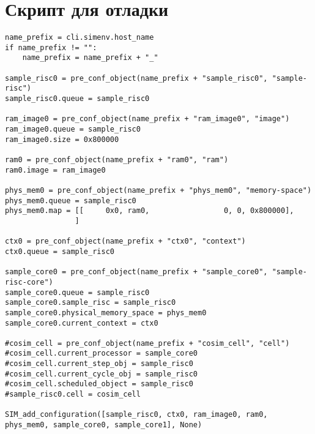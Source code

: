 \chapter{Скрипт для отладки}\label{chap:app-broken-script}

\begin{lstlisting}
name_prefix = cli.simenv.host_name
if name_prefix != "":
    name_prefix = name_prefix + "_"

sample_risc0 = pre_conf_object(name_prefix + "sample_risc0", "sample-risc")
sample_risc0.queue = sample_risc0

ram_image0 = pre_conf_object(name_prefix + "ram_image0", "image")
ram_image0.queue = sample_risc0
ram_image0.size = 0x800000

ram0 = pre_conf_object(name_prefix + "ram0", "ram")
ram0.image = ram_image0

phys_mem0 = pre_conf_object(name_prefix + "phys_mem0", "memory-space")
phys_mem0.queue = sample_risc0
phys_mem0.map = [[     0x0, ram0,                 0, 0, 0x800000],
                ]

ctx0 = pre_conf_object(name_prefix + "ctx0", "context")
ctx0.queue = sample_risc0

sample_core0 = pre_conf_object(name_prefix + "sample_core0", "sample-risc-core")
sample_core0.queue = sample_risc0
sample_core0.sample_risc = sample_risc0
sample_core0.physical_memory_space = phys_mem0
sample_core0.current_context = ctx0

#cosim_cell = pre_conf_object(name_prefix + "cosim_cell", "cell")
#cosim_cell.current_processor = sample_core0
#cosim_cell.current_step_obj = sample_risc0
#cosim_cell.current_cycle_obj = sample_risc0
#cosim_cell.scheduled_object = sample_risc0
#sample_risc0.cell = cosim_cell

SIM_add_configuration([sample_risc0, ctx0, ram_image0, ram0, phys_mem0, sample_core0, sample_core1], None)
\end{lstlisting}
